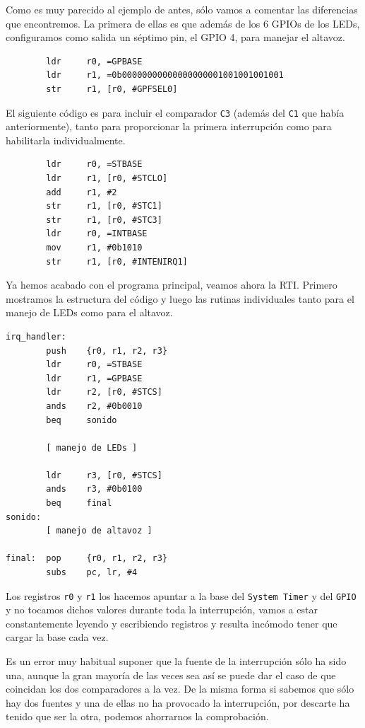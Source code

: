 Como es muy parecido al ejemplo de antes, sólo vamos a comentar las diferencias que encontremos.
La primera de ellas es que además de los 6 GPIOs de los LEDs, configuramos como salida un séptimo
pin, el GPIO 4, para manejar el altavoz.

\begin{lstlisting}
        ldr     r0, =GPBASE
        ldr     r1, =0b00000000000000000001001001001001
        str     r1, [r0, #GPFSEL0]
\end{lstlisting}

El siguiente código es para incluir el comparador {\tt C3} (además del {\tt C1} que había
anteriormente), tanto para proporcionar la primera
interrupción como para habilitarla individualmente.

\begin{lstlisting}
        ldr     r0, =STBASE
        ldr     r1, [r0, #STCLO]
        add     r1, #2
        str     r1, [r0, #STC1]
        str     r1, [r0, #STC3]
        ldr     r0, =INTBASE
        mov     r1, #0b1010
        str     r1, [r0, #INTENIRQ1]
\end{lstlisting}

Ya hemos acabado con el programa principal, veamos ahora la RTI. Primero mostramos la estructura
del código y luego las rutinas individuales tanto para el manejo de LEDs como para el
altavoz.

\begin{lstlisting}
irq_handler:
        push    {r0, r1, r2, r3}
        ldr     r0, =STBASE
        ldr     r1, =GPBASE
        ldr     r2, [r0, #STCS]
        ands    r2, #0b0010
        beq     sonido

        [ manejo de LEDs ]

        ldr     r3, [r0, #STCS]
        ands    r3, #0b0100
        beq     final
sonido:
        [ manejo de altavoz ]

final:  pop     {r0, r1, r2, r3}
        subs    pc, lr, #4
\end{lstlisting}

Los registros {\tt r0} y {\tt r1} los hacemos apuntar a la base del {\tt System Timer} y del
{\tt GPIO} y no tocamos dichos valores durante toda la interrupción, vamos a estar
constantemente leyendo y escribiendo registros y resulta incómodo tener que cargar la
base cada vez.

Es un error muy habitual suponer que la fuente de la interrupción sólo ha sido una, aunque
la gran mayoría de las veces sea así se puede dar el caso de que coincidan los dos comparadores
a la vez. De la misma forma si sabemos que sólo hay dos fuentes y una de ellas no ha
provocado la interrupción, por descarte ha tenido que ser la otra, podemos ahorrarnos la
comprobación.

